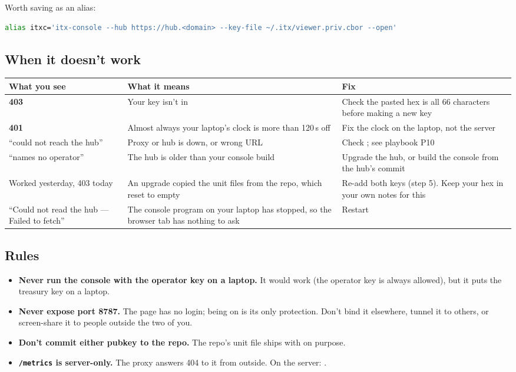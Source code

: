 \documentclass[11pt]{article}
\begin{document}
Worth saving as an alias:
\begin{lstlisting}[language=bash]
alias itxc='itx-console --hub https://hub.<domain> --key-file ~/.itx/viewer.priv.cbor --open'
\end{lstlisting}

\subsection{When it doesn't work}

\begingroup\small
\begin{longtable}{@{}L{4cm}L{6.2cm}L{5.3cm}@{}}
\toprule
\textbf{What you see} & \textbf{What it means} & \textbf{Fix} \\
\midrule
\endhead
\textbf{403} & Your key isn't in  & Check the pasted hex is all 66 characters before making a new key \\
\textbf{401} & Almost always your laptop's clock is more than 120\,s off & Fix the clock on the laptop, not the server \\
``could not reach the hub'' & Proxy or hub is down, or wrong  URL & Check ; see playbook P10 \\
``names no operator'' & The hub is older than your console build & Upgrade the hub, or build the console from the hub's commit \\
Worked yesterday, 403 today & An upgrade copied the unit files from the repo, which reset  to empty & Re-add both keys (step 5). Keep your hex in your own notes for this \\
``Could not read the hub --- Failed to fetch'' & The console program on your laptop has stopped, so the browser tab has nothing to ask & Restart  \\
\bottomrule
\end{longtable}
\endgroup

\subsection{Rules}

\begin{itemize}[leftmargin=1.5em]
  \item \textbf{Never run the console with the operator key on a laptop.} It would work (the operator key is always allowed), but it puts the treasury key on a laptop.
  \item \textbf{Never expose port 8787.} The page has no login; being on  is its only protection. Don't bind it elsewhere, tunnel it to others, or screen-share it to people outside the two of you.
  \item \textbf{Don't commit either pubkey to the repo.} The repo's unit file ships with  on purpose.
  \item \textbf{\texttt{/metrics} is server-only.} The proxy answers 404 to it from outside. On the server: .
\end{itemize}
\end{document}
